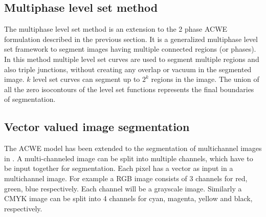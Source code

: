 \documentclass[10pt,letterpaper, onecolumn]{article}
\begin{document}
\subsection{Multiphase level set method}

The multiphase level set method \cite{vese2002multiphase} is an extension to the 2 phase ACWE formulation described in the previous section. It is a generalized multiphase level set framework to segment images having multiple connected regions (or phases). In this method multiple level set curves are used to segment multiple regions and also triple junctions, without creating any overlap or vacuum in the segmented image. $k$ level set curves can segment up to $2^k$ regions in the image. The union of all the zero isocontours of the level set functions represents the final boundaries of segmentation. 

\subsection{Vector valued image segmentation}
The ACWE model has been extended to the segmentation of multichannel images in
\cite{chan2000active}. A multi-channeled image can be split into multiple channels, which have to be input together for segmentation. Each pixel has a vector as input in a multichannel image. For example a RGB image consists of 3 channels for red, green, blue respectively. Each channel will be a grayscale image. Similarly a CMYK image can be split into 4 channels for cyan, magenta, yellow and black, respectively.

\begin{appendices}
\section{}
\label{Appendix-A}


\end{appendices}







 
\end{document}
